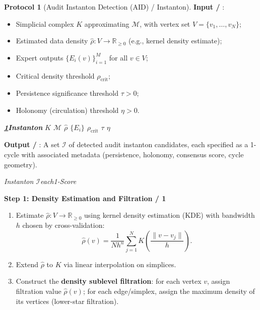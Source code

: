 \documentclass[11pt,a4paper]{article}
\theoremstyle{plain}
\theoremstyle{definition}
\newtheorem{protocol}[theorem]{Protocol}
\newcommand{\R}{\mathbb{R}}
\newcommand{\cM}{\mathcal{M}}
\newcommand{\cI}{\mathcal{I}}
\begin{document}
\begin{protocol}[Audit Instanton Detection (AID) / Instanton]
\label{prot:aid}
\textbf{Input / }:
\begin{itemize}
  \item Simplicial complex $K$ approximating $\cM$, with vertex set 
        $V = \{v_1, \ldots, v_N\}$;
  \item Estimated data density $\hat{\rho}: V \to \R_{\geq 0}$ (e.g., 
        kernel density estimate);
  \item Expert outputs $\{E_i(v)\}_{i=1}^{M}$ for all $v \in V$;
  \item Critical density threshold $\rho_{\text{crit}}$;
  \item Persistence significance threshold $\tau > 0$;
  \item Holonomy (circulation) threshold $\eta > 0$.
\end{itemize}

\bigskip
\noindent
\textit{\textbf{ \ref{prot:aid}Instanton}}
\textit{\textbf{} $K$  $\cM$ $\hat{\rho}$ $\{E_i\}$ $\rho_{\text{crit}}$ $\tau$ $\eta$}

\medskip
\noindent
\textbf{Output / }: 
A set $\cI$ of detected audit instanton candidates, each specified as a 
1-cycle with associated metadata (persistence, holonomy, consensus score, 
cycle geometry).

\bigskip
\noindent
\textit{\textbf{}Instanton $\cI$each1-Score}

\medskip
\noindent
\textbf{Step 1: Density Estimation and Filtration / 1}
\begin{enumerate}[label=\arabic*.]
  \item Estimate $\hat{\rho}: V \to \R_{\geq 0}$ using kernel density 
        estimation (KDE) with bandwidth $h$ chosen by cross-validation:
        \begin{equation}
          \hat{\rho}(v) = \frac{1}{N h^n} \sum_{j=1}^{N} 
            K\left(\frac{\|v - v_j\|}{h}\right).
          \label{eq:kde}
        \end{equation}
  \item Extend $\hat{\rho}$ to $K$ via linear interpolation on simplices.
  \item Construct the \textbf{density sublevel filtration}: 
        for each vertex $v$, assign filtration value $\hat{\rho}(v)$; 
        for each edge/simplex, assign the maximum density of its vertices 
        (lower-star filtration).


\end{enumerate}
\end{protocol}
\end{document}
